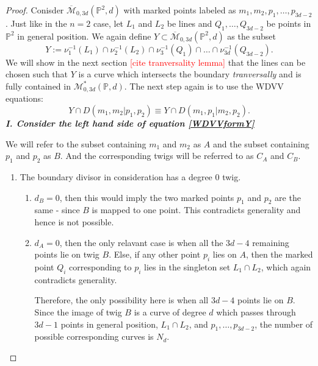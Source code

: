 \begin{proof}
    Conisder $\overline{\mathcal{M}}_{0,3d}(\mathbb{P}^{2},d)$ with marked points labeled as $m_{1}, m_{2}, p_{1}, \dots, p_{3d-2}$.
    Just like in the $n=2$ case, let $L_{1}$ and $L_{2}$ be lines and $Q_{1},\dots, Q_{3d-2}$ be points in $\mathbb{P}^{2}$ in general position.
    We again define $Y \subset \overline{\mathcal{M}}_{0,3d}(\mathbb{P}^{2},d)$ as the subset 
    \[
        Y := \nu_{1}^{-1}(L_{1}) \cap \nu_{2}^{-1}(L_{2}) \cap \nu_{3}^{-1}(Q_{1}) \cap \dots \cap \nu_{3d}^{-1}(Q_{3d-2}).
    \]
    We will show in the next section \textcolor{red}{[cite tranversality lemma]} that the lines can be chosen such that $Y$ is a curve which intersects the boundary \textit{tranversally} and is fully contained in $\mathcal{M}^{*}_{0,3d}(\mathbb{P},d)$.
    The next step again is to use the WDVV equations:
    \begin{equation}
        \label{WDVVformY}
        Y \cap D(m_{1}, m_{2} | p_{1}, p_{2}) \equiv Y \cap D(m_{1}, p_{1} | m_{2}, p_{2}).
    \end{equation}
    \textbf{\textit{I. Consider the left hand side of equation \ref{WDVVformY}}} 
    \par We will refer to the subset containing $m_{1}$ and $m_{2}$ as $A$ and the subset containing $p_{1}$ and $p_{2}$ as $B$.
    And the corresponding twigs will be referred to as $C_{A}$ and $C_{B}$.
    \begin{enumerate}
        \item The boundary divisor in consideration has a degree $0$ twig.
        \begin{enumerate}
            \item $d_{B} = 0$, then this would imply the two marked points $p_{1}$ and $p_{2}$ are the same - since $B$ is mapped to one point. This contradicts generality and hence is not possible.
            \item $d_{A} = 0$, then the only relavant case is when all the $3d-4$ remaining points lie on twig $B$. 
                Else, if any other point $p_{i}$ lies on $A$, then the marked point $Q_{i}$ corresponding to $p_{i}$ lies in the singleton set $L_{1}\cap L_{2}$, which again contradicts generality.
                \par Therefore, the only possibility here is when all $3d-4$ points lie on $B$.
                Since the image of twig $B$ is a curve of degree $d$ which passes through $3d-1$ points in general position, $L_{1}\cap L_{2}$, and $p_{1}, \dots, p_{3d-2}$, the number of possible corresponding curves is $N_{d}$.

\end{enumerate}
\end{enumerate}
\end{proof}
